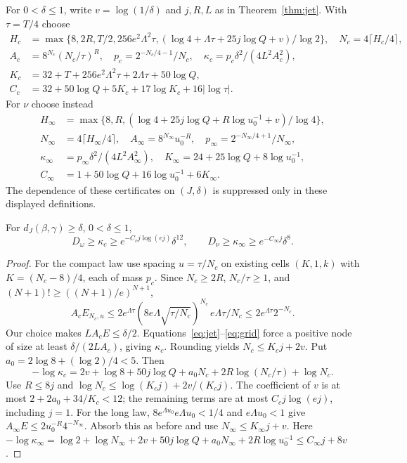For $0<\delta\le1$, write $v=\log(1/\delta)$ and $j,R,L$ as in
Theorem~\ref{thm:jet}. With $\tau=T/4$ choose
\begin{align*}
 H_c&=\max\{8,2R,T/2,256e^2\Lambda^2\tau,
  (\log4+\Lambda\tau+25j\log Q+v)/\log2\},\quad N_c=4\lceil H_c/4\rceil,\\
 A_c&=8^{N_c}(N_c/\tau)^R,\quad p_c=2^{-N_c/4-1}/N_c,\quad
 \kappa_c=p_c\delta^2/(4L^2A_c^2),\\
 K_c&=32+T+256e^2\Lambda^2\tau+2\Lambda\tau+50\log Q,\\
 C_c&=32+50\log Q+5K_c+17\log K_c+16|\log\tau|.
\end{align*}
For $\nu$ choose instead
\begin{align*}
 H_\infty&=\max\{8,R,(\log4+25j\log Q+R\log u_0^{-1}+v)/\log4\},\\
 N_\infty&=4\lceil H_\infty/4\rceil,\quad
 A_\infty=8^{N_\infty}u_0^{-R},\quad p_\infty=2^{-N_\infty/4+1}/N_\infty,\\
 \kappa_\infty&=p_\infty\delta^2/(4L^2A_\infty^2),\quad
 K_\infty=24+25\log Q+8\log u_0^{-1},\\
 C_\infty&=1+50\log Q+16\log u_0^{-1}+6K_\infty.
\end{align*}
The dependence of these certificates on $(J,\delta)$ is suppressed only in
these displayed definitions.

\begin{proposition}
\label{prop:separation}
For $d_J(\beta,\gamma)\ge\delta$, $0<\delta\le1$,
\begin{equation}
 D_\omega\ge\kappa_c\ge e^{-C_cj\log(ej)}\delta^{12},\qquad
 D_\nu\ge\kappa_\infty\ge e^{-C_\infty j}\delta^8.
 \label{eq:separation}
\end{equation}
\end{proposition}
\begin{proof}
For the compact law use spacing $u=\tau/N_c$ on existing cells
$(K,1,k)$ with $K=(N_c-8)/4$, each of mass $p_c$. Since $N_c\ge2R$,
$N_c/\tau\ge1$, and $(N+1)!\ge((N+1)/e)^{N+1}$,
\[
 A_cE_{N_c,u}\le2e^{\Lambda\tau}
 (8e\Lambda\sqrt{\tau/N_c})^{N_c}\,e\Lambda\tau/N_c
 \le2e^{\Lambda\tau}2^{-N_c}.
\]
Our choice makes $LA_cE\le\delta/2$. Equations~\eqref{eq:jet}--\eqref{eq:grid}
force a positive node of size at least $\delta/(2LA_c)$, giving $\kappa_c$.
Rounding yields $N_c\le K_cj+2v$. Put $a_0=2\log8+(\log2)/4<5$. Then
\[
 -\log\kappa_c=2v+\log8+50j\log Q+a_0N_c
                      +2R\log(N_c/\tau)+\log N_c.
\]
Use $R\le8j$ and $\log N_c\le\log(K_cj)+2v/(K_cj)$.
The coefficient of $v$ is at most $2+2a_0+34/K_c<12$; the remaining
terms are at most $C_cj\log(ej)$, including $j=1$.
For the long law, $8e^{\Lambda u_0}e\Lambda u_0<1/4$ and
$e\Lambda u_0<1$ give $A_\infty E\le2u_0^{-R}4^{-N_\infty}$.
Absorb this as before and use $N_\infty\le K_\infty j+v$.
Here
$-\log\kappa_\infty=\log2+\log N_\infty+2v+50j\log Q
+a_0N_\infty+2R\log u_0^{-1}\le C_\infty j+8v$.
\end{proof}

